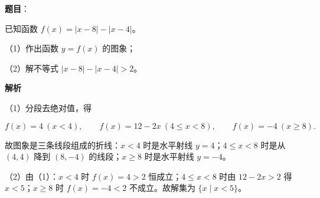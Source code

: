 \begin{answer}

\textbf{题目}：

已知函数 $f(x)=|x-8|-|x-4|$。

（1）作出函数 $y=f(x)$ 的图象；

（2）解不等式 $|x-8|-|x-4|>2$。
\nopagebreak[4]
\begin{center}\end{center}
\nopagebreak[4]
\textbf{解析}

（1）分段去绝对值，得

\nopagebreak[4]
\[f(x)=4\ (x<4),\qquad f(x)=12-2x\ (4\leqslant x<8),\qquad f(x)=-4\ (x\geqslant8).\]

故图象是三条线段组成的折线：$x<4$ 时是水平射线 $y=4$；$4\leqslant x<8$ 时是从 $(4,4)$ 降到 $(8,-4)$ 的线段；$x\geqslant8$ 时是水平射线 $y=-4$。

（2）由（1）：$x<4$ 时 $f(x)=4>2$ 恒成立；$4\leqslant x<8$ 时由 $12-2x>2$ 得 $x<5$；$x\geqslant8$ 时 $f(x)=-4<2$ 不成立。故解集为 $\{x\mid x<5\}$。


\end{answer}